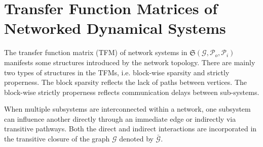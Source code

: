 



\section{Transfer Function Matrices of Networked Dynamical Systems}
The transfer function matrix (TFM) of network systems in \(\mathfrak{S}(\mathcal{G}, \mathcal{P}_o, \mathcal{P}_i)\) manifests some structures introduced by the network topology. There are mainly two types of structures in the TFMs, i.e. block-wise sparsity and strictly properness. The block sparsity reflects the lack of paths between vertices. The block-wise strictly properness reflects communication delays between sub-systems.

When multiple subsystems are interconnected within a network, one subsystem can influence another directly through an immediate edge or indirectly via transitive pathways.
Both the direct and indirect interactions are incorporated in the transitive
closure of the graph ${\mathcal G}$ denoted by \(\bar{\mathcal{G}}\).

